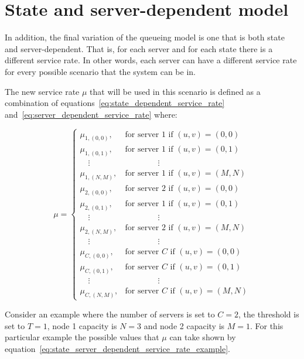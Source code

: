 \section{State and server-dependent model}\label{sec:state_server_dependent_model}

In addition, the final variation of the queueing model is one that is both
state and server-dependent.
That is, for each server and for each state there is a different service rate.
In other words, each server can have a different service rate for every
possible scenario that the system can be in.

The new service rate \(\mu\) that will be used in this scenario is defined as
a combination of equations~\eqref{eq:state_dependent_service_rate}
and~\eqref{eq:server_dependent_service_rate} where:

\begin{equation}\label{eq:state_server_dependent_service_rate}
    \mu =
    \begin{cases}
        \mu_{1, (0,0)}, & \text{for server } 1 \text{ if } (u, v) = (0, 0) \\
        \mu_{1, (0,1)}, & \text{for server } 1 \text{ if } (u, v) = (0, 1) \\
        \quad \vdots & \qquad \qquad \vdots \\
        \mu_{1, (N,M)}, & \text{for server } 1 \text{ if } (u, v) = (M, N) \\
        \mu_{2, (0,0)}, & \text{for server } 2 \text{ if } (u, v) = (0, 0) \\
        \mu_{2, (0,1)}, & \text{for server } 1 \text{ if } (u, v) = (0, 1) \\
        \quad \vdots & \qquad \qquad \vdots \\
        \mu_{2, (N,M)}, & \text{for server } 2 \text{ if } (u, v) = (M, N) \\
        \quad \vdots & \qquad \qquad \vdots \\
        \mu_{C, (0,0)}, & \text{for server } C \text{ if } (u, v) = (0, 0) \\
        \mu_{C, (0,1)}, & \text{for server } C \text{ if } (u, v) = (0, 1) \\
        \quad \vdots & \qquad \qquad \vdots \\
        \mu_{C, (N,M)}, & \text{for server } C \text{ if } (u, v) = (M, N)
    \end{cases}
\end{equation}

Consider an example where the number of servers is set to \(C = 2\), the
threshold is set to \(T = 1\), node 1 capacity is \(N = 3\) and node 2 capacity
is \(M = 1\).
For this particular example the possible values that \(\mu\) can take shown
by equation~\eqref{eq:state_server_dependent_service_rate_example}.

